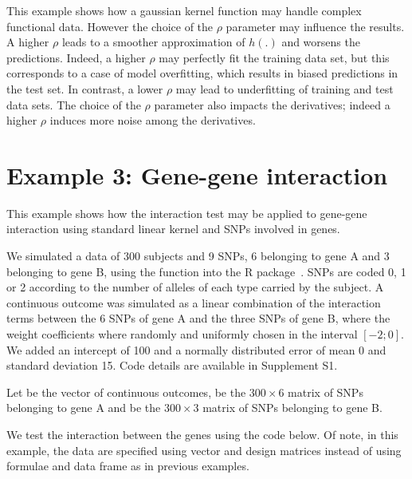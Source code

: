 This example shows how a gaussian kernel function may handle complex functional data. However the choice of the $\rho$ parameter may influence the results. A higher $\rho$ leads to a smoother approximation of $h(.)$ and worsens the predictions. Indeed, a higher $\rho$ may perfectly fit the training data set, but this corresponds to a case of model overfitting, which results in biased predictions in the test set. In contrast, a lower $\rho$ may lead to underfitting of training and test data sets. The choice of the $\rho$ parameter also impacts the derivatives; indeed a higher $\rho$ induces more noise among the derivatives.



\section{Example 3: Gene-gene interaction} \label{sec:illustrations-gene}
This example shows how the interaction test may be applied to gene-gene interaction using standard linear kernel and SNPs involved in genes.

We simulated a data of 300 subjects and 9 SNPs, 6 belonging to gene A and 3 belonging to gene B, using the  function into the  R package~\citep{adegenet}. SNPs are coded 0, 1 or 2 according to the number of alleles of each type carried by the subject.
A continuous outcome was simulated as a linear combination of the interaction terms between the 6 SNPs of gene A and the three SNPs of gene B, where the weight coefficients where randomly and uniformly chosen in the interval $\left[-2;0\right]$. We added an intercept of 100 and a normally distributed error of mean 0 and standard deviation 15. Code details are available in Supplement S1.


Let  be the vector of continuous outcomes,  be the $300 \times 6$ matrix of SNPs belonging to gene A and  be the $300 \times 3$ matrix of SNPs belonging to gene B. 



We test the interaction between the genes using the code below. Of note, in this example, the data are specified using vector and design matrices instead of using formulae and data frame as in previous examples.




